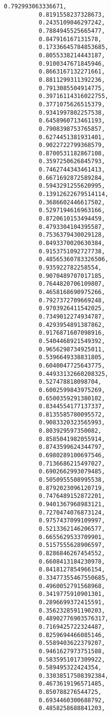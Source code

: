 \documentclass[11pt]{article}
\begin{document}
\begin{Verbatim}[commandchars=\\\{\}]
          0.792993063336671,
          0.8191558237328673,
          0.2435109046297242,
          0.7884945525665477,
          0.847916167131578,
          0.17336645784853685,
          0.8055338214443187,
          0.9100347671845946,
          0.8663167132271661,
          0.8811299311392236,
          0.7913085504914775,
          0.39716114316022755,
          0.3771075626515379,
          0.9341997802257538,
          0.6458960713461193,
          0.7908398753765857,
          0.6274451381931401,
          0.9022722799368579,
          0.8700531182867108,
          0.3597250626845793,
          0.7462744343461413,
          0.6671692872589284,
          0.5943291255620995,
          0.13912622679514114,
          0.3686602446617502,
          0.5297194616963166,
          0.8720610153494459,
          0.4793304104395587,
          0.7536379430029128,
          0.8493370020630384,
          0.9153751092727738,
          0.48565360783326506,
          0.935922782258554,
          0.9070489707017185,
          0.7644820706109807,
          0.4658168690975266,
          0.7927372709669248,
          0.9703926411542025,
          0.7349012274934787,
          0.4293954891387862,
          0.9176871607098916,
          0.5404468921549392,
          0.9656298734925011,
          0.5396649338831805,
          0.6040047725643775,
          0.44933132660208325,
          0.527478818098704,
          0.6002599843975269,
          0.6500359291380102,
          0.8344554177137337,
          0.8135585780095572,
          0.9083320323565993,
          0.803929597350082,
          0.8585041982055914,
          0.8743599624344797,
          0.6980289100697546,
          0.7136686215497027,
          0.6902662993079485,
          0.5050955508995538,
          0.8792023096120719,
          0.7476489152872201,
          0.9401367968983121,
          0.7270474076873124,
          0.9757437099109997,
          0.5213362146206577,
          0.6655629533709901,
          0.5157555628906597,
          0.8286846267454552,
          0.6608413184230978,
          0.8418127854966154,
          0.33477355467550685,
          0.4960052791568968,
          0.3419775910901301,
          0.2896699372415591,
          0.3562328591190203,
          0.48902776903576317,
          0.7169425722324487,
          0.8259694466085146,
          0.5589403622379207,
          0.9461627973751588,
          0.5835951017309922,
          0.589495322424354,
          0.33038517508392384,
          0.4673619196571485,
          0.850788276544725,
          0.6934460300688792,
          0.4858258688841203,

\end{Verbatim}
\end{document}
